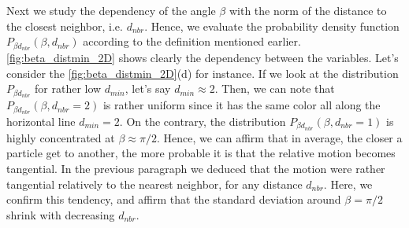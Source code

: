 Next we study the dependency of the angle $\beta$ with the norm of the distance to the closest neighbor, i.e. $d_{nbr}$.
Hence, we evaluate the probability density function $P_{\beta d_{nbr}}(\beta, d_{nbr})$ according to the definition mentioned earlier. 
\ref{fig:beta_distmin_2D} shows clearly the dependency between the variables. 
Let's consider the \ref{fig:beta_distmin_2D}(d) for instance. 
If we look at the distribution $P_{\beta d_{nbr}}$ for rather low $d_{min}$, let's say $d_{min}\approx 2$.
Then, we can note that $P_{\beta d_{nbr}}(\beta, d_{nbr} = 2)$ is rather uniform since it has the same color all along the horizontal line $d_{min} = 2$.
On the contrary, the distribution  $P_{\beta d_{nbr}}(\beta, d_{nbr} = 1)$ is highly concentrated at $\beta \approx \pi/2$.
Hence, we can affirm that in average, the closer a particle get to another, the more probable it is that the relative motion becomes tangential.
In the previous paragraph we deduced that the motion were rather tangential relatively to the nearest neighbor, for any distance $d_{nbr}$.
Here, we confirm this tendency, and affirm that the standard deviation around $\beta =\pi/2$ shrink with decreasing $d_{nbr}$.
